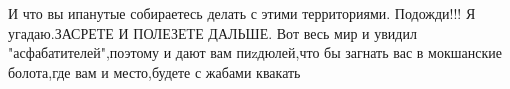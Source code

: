  
 
 
 
 


И что вы ипанутые собираетесь делать с этими территориями. Подожди!!! Я
угадаю.ЗАСРЕТЕ И ПОЛЕЗЕТЕ ДАЛЬШЕ. Вот весь мир и увидил "асфабатителей",поэтому
и дают вам пиzдюлей,что бы загнать вас в мокшанские болота,где вам и
место,будете с жабами квакать

